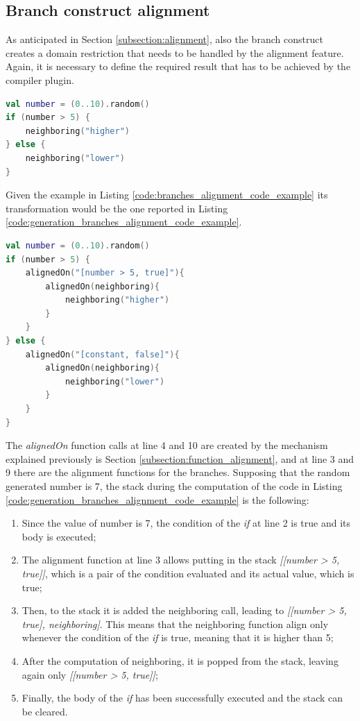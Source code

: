 \subsection{Branch construct alignment}\label{subsection:branch_alignment}
As anticipated in Section \ref{subsection:alignment}, also the branch construct creates a domain restriction that needs to be handled by the alignment feature.\newline
Again, it is necessary to define the required result that has to be achieved by the compiler plugin.
\begin{lstlisting}[caption={Base example of Koltin code that requires the branch alignment}, captionpos=b, language=Kotlin, label={code:branches_alignment_code_example}]
val number = (0..10).random()
if (number > 5) {
    neighboring("higher")
} else {
    neighboring("lower")
}
\end{lstlisting}
Given the example in Listing \ref{code:branches_alignment_code_example} its transformation would be the one reported in Listing \ref{code:generation_branches_alignment_code_example}.
\begin{lstlisting}[caption={Generation goal to handle the alignment of branches required in Listing \ref{code:first_alignment_code_example}}, captionpos=b, language=Kotlin, label={code:generation_branches_alignment_code_example}]
val number = (0..10).random()
if (number > 5) {
    alignedOn("[number > 5, true]"){
        alignedOn(neighboring){
            neighboring("higher")
        }
    }
} else {
    alignedOn("[constant, false]"){
        alignedOn(neighboring){
            neighboring("lower")
        }
    }
}
\end{lstlisting}
The \textit{alignedOn} function calls at line 4 and 10 are created by the mechanism explained previously is Section \ref{subsection:function_alignment}, and at line 3 and 9 there are the alignment functions for the branches.\newline
Supposing that the random generated number is 7, the stack during the computation of the code in Listing \ref{code:generation_branches_alignment_code_example} is the following:
\begin{enumerate}
    \item Since the value of number is 7, the condition of the \textit{if} at line 2 is true and its body is executed;
    \item The alignment function at line 3 allows putting in the stack \textit{[[number > 5, true]]}, which is a pair of the condition evaluated and its actual value, which is true;
    \item Then, to the stack it is added the neighboring call, leading to \textit{[[number > 5, true], neighboring]}. This means that the neighboring function align only whenever the condition of the \textit{if} is true, meaning that it is higher than 5;
    \item After the computation of neighboring, it is popped from the stack, leaving again only \textit{[[number > 5, true]]};
    \item Finally, the body of the \textit{if} has been successfully executed and the stack can be cleared.
\end{enumerate}

